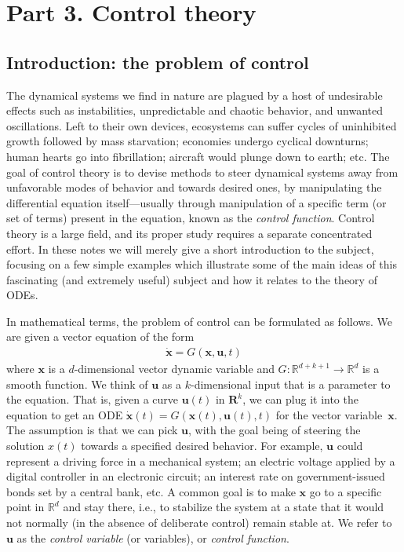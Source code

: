 \documentclass[12pt]{amsart}
\newcommand{\eqst}[1]{\begin{align*}#1\end{align*}}
\newcommand{\R}{\mathbb{R}}
\newcounter{example}
\begin{document}


\newpage


\section*{Part 3. Control theory}
\addtocounter{section}{1}
\setcounter{subsection}{0}

%

\subsection{Introduction: the problem of control}

The dynamical systems we find in nature are plagued by a host of undesirable effects such as instabilities, unpredictable and chaotic behavior, and unwanted oscillations. Left to their own devices, ecosystems can suffer cycles of uninhibited growth followed by mass starvation; economies undergo cyclical downturns; human hearts go into fibrillation; aircraft would plunge down to earth; etc. The goal of control theory is to devise methods to steer dynamical systems away from unfavorable modes of behavior and towards desired ones, by manipulating the differential equation itself---usually through manipulation of a specific term (or set of terms) present in the equation, known as the \emph{control function}. Control theory is a large field, and its proper study requires a separate concentrated effort. In these notes we will merely give a short introduction to the subject, focusing on a few simple examples which illustrate some of the main ideas of this fascinating (and extremely useful) subject and how it relates to the theory of ODEs.

In mathematical terms, the problem of control can be formulated as follows. We are given a vector equation of the form
\eqst{
\dot{\mathbf{x}} = G(\mathbf{x},\mathbf{u},t)
}
where $\mathbf{x}$ is a $d$-dimensional vector dynamic variable and \hbox{$G:\mathbb{R}^{d+k+1}\to\R^d$} is a smooth function. We think of $\mathbf{u}$ as a $k$-dimensional input that is a parameter to the equation. That is, given a curve $\mathbf{u}(t)$ in $\mathbf{R}^k$, we can plug it into the equation to get an ODE
$\dot{\mathbf{x}}(t) = G(\mathbf{x}(t),\mathbf{u}(t),t)$ for the vector variable~$\mathbf{x}$.
The assumption is that we can pick $\mathbf{u}$, with the goal being of steering the solution $x(t)$ towards a specified desired behavior. For example, $\mathbf{u}$ could represent a driving force in a mechanical system; an electric voltage applied by a digital controller in an electronic circuit; an interest rate on government-issued bonds set by a central bank, etc. A common goal is to make $\mathbf{x}$ go to a specific point in $\mathbb{R}^d$ and stay there, i.e., to stabilize the system at a state that it would not normally (in the absence of deliberate control) remain stable at. We refer to $\mathbf{u}$ as the \emph{control variable} (or variables), or \emph{control function}.
\end{document}

